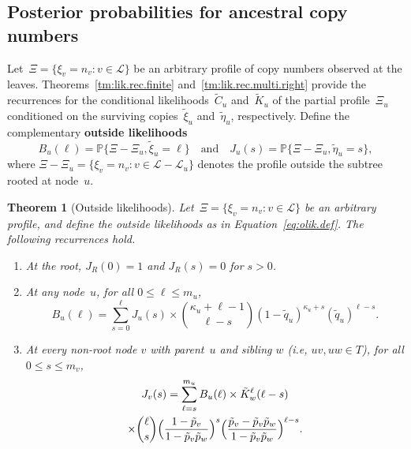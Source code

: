 \documentclass{elsarticle}
\newcommand{\PROB}{\mathbb{P}}
\newcommand{\definehere}[1]{\textcolor{webbrown}{\bf #1}}
\newtheorem{theorem}{Theorem}
\newcommand{\nlik}{C}
\newcommand{\slik}{K}
\newcommand{\nolik}{B}
\newcommand{\solik}{J}
\newcommand{\nx}{u}
\newcommand{\ny}{v}
\newcommand{\nz}{w}
\newcommand{\troot}{R}
\begin{document}
\subsection{Posterior probabilities for ancestral copy numbers}
Let~$\Xi=\{\xi_{\ny}=n_{\ny}\colon \ny\in\mathcal{L}\}$ be an arbitrary profile
of copy numbers observed at the leaves.  
Theorems~\ref{tm:lik.rec.finite} and~\ref{tm:lik.rec.multi.right} 
provide the recurrences for the conditional 
likelihoods~$\tilde{\nlik}_u$ and~$\tilde{\slik}_u$ 
of the partial profile~$\Xi_u$ conditioned 
on the surviving copies~$\tilde{\xi}_u$ and~$\tilde{\eta}_u$,
respectively. Define the complementary \definehere{outside likelihoods} 
\begin{equation}\label{eq:olik.def}
\nolik_{\nx}(\ell) = \PROB\{\Xi-\Xi_{\nx}, \tilde{\xi}_{\nx}=\ell\}
\quad\text{and}\quad
\solik_{\nx}(s) = \PROB\{\Xi-\Xi_{\nx}, \tilde{\eta}_{\nx}=s\},
\end{equation}
where $\Xi-\Xi_u = \bigl\{\xi_{\ny}=n_{\ny}\colon \ny\in \mathcal{L}-\mathcal{L}_{\nx}\bigr\}$ 
denotes the profile outside the subtree rooted at node~$\nx$. 
\begin{theorem}[Outside likelihoods]\label{tm:olik.rec}
Let~$\Xi=\{\xi_{\ny}=n_{\ny}\colon \ny\in\mathcal{L}\}$ be an arbitrary profile, 
and define the outside likelihoods as in Equation~\eqref{eq:olik.def}. 
The following recurrences hold. 
\begin{enumerate}[label=(\roman*)]
\item At the root, $\solik_{\troot}(0)=1$ and $\solik_{\troot}(s)=0$ for $s>0$. 
\item At any node~$\nx$, for all $0\le \ell \le m_{\nx}$, 
\begin{equation}\label{eq:olik.node}
\nolik_{\nx}(\ell) = \sum_{s=0}^{\ell} 
	\solik_{\nx}(s) \times \binom{\kappa_{\nx}+\ell-1}{\ell-s}(1-\tilde{q}_{\nx})^{\kappa_{\nx}+s}(\tilde{q}_{\nx})^{\ell-s}.
\end{equation}
\item At every non-root node $\ny$ with parent~$\nx$ and sibling $\nz$ (i.e, $\nx\ny,\nx\nz\in T$), 
	for all $0\le s\le m_{\ny}$, 
\begin{multline}\label{eq:olik.edge}
\solik_{\ny}(s) = 
	\sum_{\ell=s}^{m_{\nx}}
		\nolik_{\nx}(\ell)
		\times \tilde{\slik}_{\nz}^{\ell}(\ell-s)
		\\
		\times \binom{\ell}{s}
			\Bigl(\frac{1-\tilde{p}_{\ny}}{1-\tilde{p}_{\ny}\tilde{p}_{\nz}}\Bigr)^{s}
			\Bigl(\frac{\tilde{p}_{\ny}-\tilde{p}_{\ny}\tilde{p}_{\nz}}{1-\tilde{p}_{\ny}\tilde{p}_{\nz}}\Bigr)^{\ell-s}.			
\end{multline}
\end{enumerate}
\end{theorem}
\end{document}
